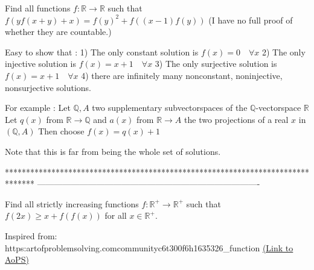 \begin{solution}
	\begin{tcolorbox}Find all functions $f:\mathbb{R} \rightarrow \mathbb{R}$ such that $f(yf(x+y)+x)=f(y)^2+f((x-1)f(y))$
(I have no full proof of whether they are countable.)\end{tcolorbox}
Easy to show that :
1) The only constant solution is $f(x)=0\quad\forall x$
2) The only injective solution is $f(x)=x+1\quad\forall x$
3) The only surjective solution is $f(x)=x+1\quad\forall x$
4) there are infinitely many nonconstant, noninjective, nonsurjective solutions.

For example :
Let $\mathbb Q,A$ two supplementary subvectorspaces of the $\mathbb Q$-vectorspace $\mathbb R$
Let $q(x)$ from $\mathbb R\to\mathbb Q$ and $a(x)$ from $\mathbb R\to A$ the two projections of a real $x$ in $(\mathbb Q,A)$
Then choose $f(x)=q(x)+1$

Note that this is far from being the whole set of solutions.


\end{solution}
*******************************************************************************
-------------------------------------------------------------------------------

\begin{problem}
	Find all strictly increasing functions $f:\mathbb R^+\to\mathbb R^+$ such that
$f(2x)\geq x+f(f(x))$
for all $x\in\mathbb R^+$.

Inspired from:
https:\/\/artofproblemsolving.com\/community\/c6t300f6h1635326_function
	\flushright \href{https://artofproblemsolving.com/community/c6h1635852}{(Link to AoPS)}
\end{problem}



